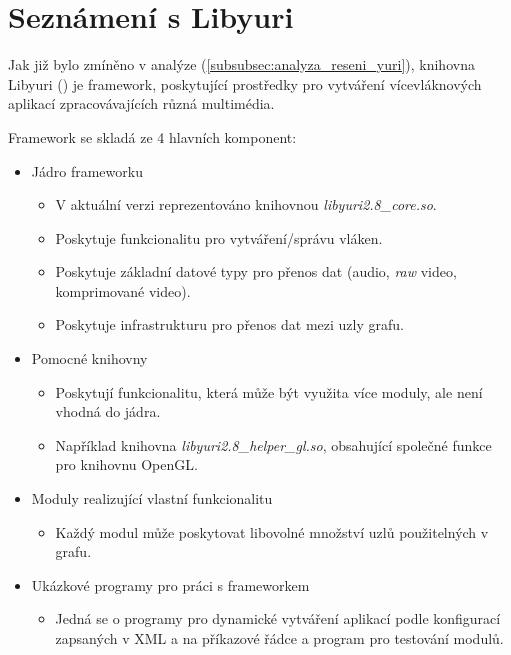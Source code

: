 \documentclass[thesis=M,czech]{FITthesis}[2012/06/26]
\begin{document}
\section{Seznámení s Libyuri} \label{sec:analyza_yuri}
Jak již bylo zmíněno v analýze (\ref{subsubsec:analyza_reseni_yuri}), knihovna Libyuri (\cite{yuri}) je framework, poskytující prostředky pro vytváření vícevláknových aplikací zpracovávajících různá multimédia.

Framework se skladá ze 4 hlavních komponent:
\begin{itemize}
\item Jádro frameworku
  \begin{itemize}
  	\item V aktuální verzi reprezentováno knihovnou \textit{libyuri2.8\_core.so}.
    \item Poskytuje funkcionalitu pro vytváření/správu vláken.
    \item Poskytuje základní datové typy pro přenos dat (audio, \textit{raw} video, komprimované video).
    \item Poskytuje infrastrukturu pro přenos dat mezi uzly grafu.
  \end{itemize}
\item Pomocné knihovny
  \begin{itemize}
    \item Poskytují funkcionalitu, která může být využita více moduly, ale není vhodná do jádra.
  	\item Například knihovna \textit{libyuri2.8\_helper\_gl.so}, obsahující společné funkce pro knihovnu OpenGL.
  \end{itemize}
\item Moduly realizující vlastní funkcionalitu
  \begin{itemize}
    \item Každý modul může poskytovat libovolné množství uzlů použitelných v grafu.
  \end{itemize}
\item Ukázkové programy pro práci s frameworkem
  \begin{itemize}
    \item Jedná se o programy pro dynamické vytváření aplikací podle konfigurací zapsaných v XML a na příkazové řádce a program pro testování modulů.
  \end{itemize}
\end{itemize}
\end{document}
